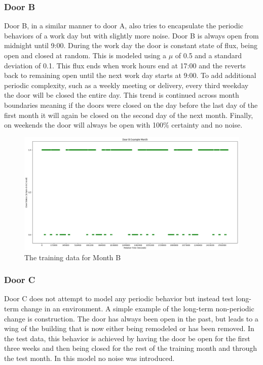   \subsubsection{ Door B }

  Door B, in a similar manner to door A, also tries to encapsulate the periodic
  behaviors of a work day but with slightly more noise. Door B is always open
  from midnight until 9:00. During the work day
  the door is constant state of flux, being open and closed at random. This is
  modeled using a $\mu$ of 0.5 and a standard deviation of 0.1. This flux ends when
  work hours end at 17:00 and the reverts back to remaining open until
  the next work day starts at 9:00. To add additional periodic complexity, such as a
  weekly meeting or delivery, every third weekday the door will be closed the
  entire day. This trend is continued across month boundaries meaning if
  the doors were closed on the day before the last day of the first month it
  will again be closed on the second day of the next month. Finally, on
  weekends the door will always be open with 100\% certainty and no noise. \\

  \begin{figure}[!htb]
    \centering
    \includegraphics[width=\linewidth]{images/Door_B_Example_Month.png}
    \caption{The training data for Month B}
    \label{figure:Door B Training Month}
  \end{figure}

  \subsubsection{ Door C }

  Door C does not attempt to model any periodic behavior but instead test
  long-term change in an environment. A simple example of the long-term
  non-periodic change is construction. The door has always been
  open in the past, but leads to a wing of the building that is now either
  being remodeled or has been removed. In the test data, this behavior is
  achieved by having the door be open for the first three weeks and then being
  closed for the rest of the training month and through the test month. In
  this model no noise was introduced. \\

